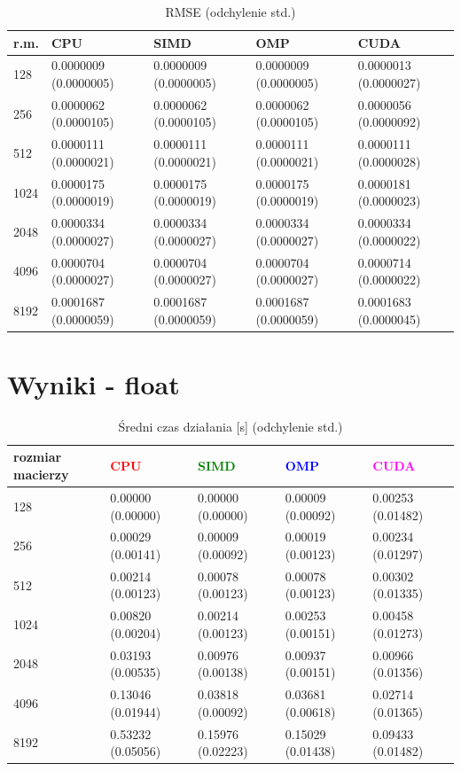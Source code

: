 \documentclass[11pt,a4paper]{article}
\begin{document}
\begin{table}[h!]
\begin{center}
\begin{tabular}{lllll}
\toprule
r.m. & CPU & SIMD & OMP & CUDA \\
\midrule
128 &  0.0000009 (0.0000005) &  0.0000009 (0.0000005) &  0.0000009 (0.0000005) &  0.0000013 (0.0000027) \\
256 &  0.0000062 (0.0000105) &  0.0000062 (0.0000105) &  0.0000062 (0.0000105) &  0.0000056 (0.0000092) \\
512 &  0.0000111 (0.0000021) &  0.0000111 (0.0000021) &  0.0000111 (0.0000021) &  0.0000111 (0.0000028) \\
1024 &  0.0000175 (0.0000019) &  0.0000175 (0.0000019) &  0.0000175 (0.0000019) &  0.0000181 (0.0000023) \\
2048 &  0.0000334 (0.0000027) &  0.0000334 (0.0000027) &  0.0000334 (0.0000027) &  0.0000334 (0.0000022) \\
4096 &  0.0000704 (0.0000027) &  0.0000704 (0.0000027) &  0.0000704 (0.0000027) &  0.0000714 (0.0000022) \\
8192 &  0.0001687 (0.0000059) &  0.0001687 (0.0000059) &  0.0001687 (0.0000059) &  0.0001683 (0.0000045) \\
\bottomrule
\end{tabular}
\caption{RMSE (odchylenie std.)}
\end{center}
\end{table}

\newpage
\section{Wyniki - float}

\begin{table}[h!]
\begin{center}
\begin{tabular}{lllll}
\toprule
rozmiar macierzy & \textcolor{red}{CPU} & \textcolor{green}{SIMD} & \textcolor{blue}{OMP} & \textcolor{magenta}{CUDA} \\
\midrule
128 &  0.00000 (0.00000) &  0.00000 (0.00000) &  0.00009 (0.00092) &  0.00253 (0.01482) \\
256 &  0.00029 (0.00141) &  0.00009 (0.00092) &  0.00019 (0.00123) &  0.00234 (0.01297) \\
512 &  0.00214 (0.00123) &  0.00078 (0.00123) &  0.00078 (0.00123) &  0.00302 (0.01335) \\
1024 &  0.00820 (0.00204) &  0.00214 (0.00123) &  0.00253 (0.00151) &  0.00458 (0.01273) \\
2048 &  0.03193 (0.00535) &  0.00976 (0.00138) &  0.00937 (0.00151) &  0.00966 (0.01356) \\
4096 &  0.13046 (0.01944) &  0.03818 (0.00092) &  0.03681 (0.00618) &  0.02714 (0.01365) \\
8192 &  0.53232 (0.05056) &  0.15976 (0.02223) &  0.15029 (0.01438) &  0.09433 (0.01482) \\
\bottomrule
\end{tabular}
\caption{Średni czas działania [s] (odchylenie std.)}
\end{center}
\end{table}
\end{document}
